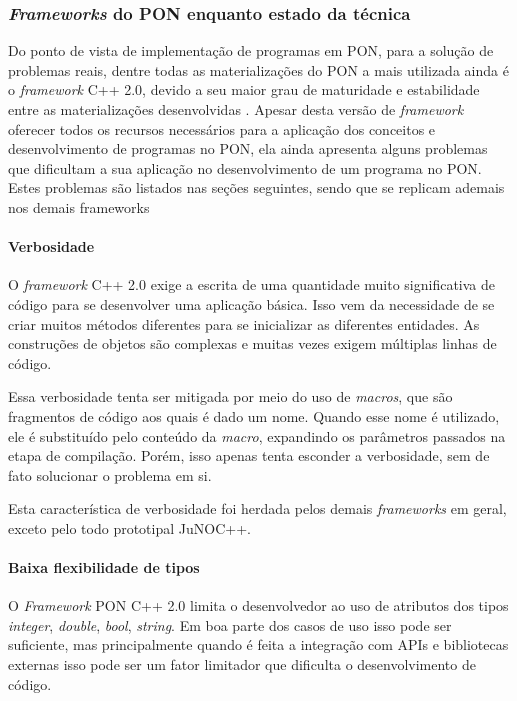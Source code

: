 \subsubsection{\textit{Frameworks} do PON enquanto estado da
técnica}\label{sec:reflex_cpp2}

Do ponto de vista de implementação de programas em PON, para a solução de
problemas reais, dentre todas as materializações do PON a mais utilizada ainda é
o \textit{framework} C++ 2.0, devido a seu maior grau de maturidade e
estabilidade entre as materializações desenvolvidas \cite{ronszcka_2017}. Apesar
desta versão de \textit{framework} oferecer todos os recursos necessários para a
aplicação dos conceitos e desenvolvimento de programas no PON, ela ainda
apresenta alguns problemas que dificultam a sua aplicação no desenvolvimento de
um programa no PON. Estes problemas são listados nas seções seguintes, sendo que
se replicam ademais nos demais frameworks

\paragraph*{Verbosidade}

O \textit{framework} C++ 2.0 exige a escrita de uma quantidade muito
significativa de código para se desenvolver uma aplicação básica. Isso vem da
necessidade de se criar muitos métodos diferentes para se inicializar as
diferentes entidades. As construções de objetos são complexas e muitas vezes
exigem múltiplas linhas de código.

Essa verbosidade tenta ser mitigada por meio do uso de \textit{macros}, que são
fragmentos de código aos quais é dado um nome. Quando esse nome é utilizado, ele
é substituído pelo conteúdo da \textit{macro}, expandindo os parâmetros passados
na etapa de compilação. Porém, isso apenas tenta esconder a verbosidade, sem de
fato solucionar o problema em si.

Esta característica de verbosidade foi herdada pelos demais \textit{frameworks}
em geral, exceto pelo todo prototipal JuNOC++.

\paragraph*{Baixa flexibilidade de tipos}

O \textit{Framework} PON C++ 2.0 limita o desenvolvedor ao uso de atributos dos
tipos \textit{integer}, \textit{double}, \textit{bool}, \textit{string}. Em boa
parte dos casos de uso isso pode ser suficiente, mas principalmente quando é
feita a integração com APIs e bibliotecas externas isso pode ser um fator
limitador que dificulta o desenvolvimento de código.

